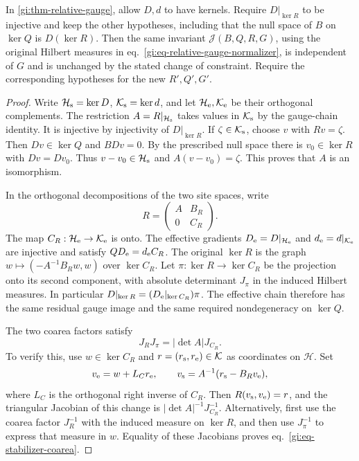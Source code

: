\documentclass[11pt,letterpaper,reqno]{amsart}
\makeatletter
\numberwithin{equation}{section}
\renewcommand{\eqref}[1]{\textup{eq.~\ref{#1}}}
\theoremstyle{definition}
\newcommand{\ms@majorstart}{%
  \pushQED{\qed}\renewcommand{\qedsymbol}{$\blacksquare\square$}}
\newenvironment{corollary}[1][]{\ms@majorstart\ms@corollary[#1]}
  {\popQED\endms@corollary}
\theoremstyle{remark}
\makeatother
\begin{document}
\begin{corollary}[A residual gauge with a stabilizer]
\label{gi:cor-relative-gauge-stabilizer}
In \cref{gi:thm-relative-gauge}, allow \(D,d\) to have kernels.
Require \(D|_{\ker R}\) to be injective and keep the other
hypotheses, including that the null space of \(B\) on \(\ker Q\)
is \(D(\ker R)\). Then the same invariant
\(\mathcal J(B,Q,R,G)\), using the original Hilbert measures in
\eqref{gi:eq-relative-gauge-normalizer}, is independent of \(G\)
and is unchanged by the stated change of constraint. Require
the corresponding hypotheses for the new \(R',Q',G'\).
\end{corollary}

\begin{proof}
Write \(\mathcal H_{\rm s}=\ker D\),
\(\mathcal K_{\rm s}=\ker d\), and let
\(\mathcal H_{\rm e},\mathcal K_{\rm e}\) be their orthogonal
complements. The restriction \(A=R|_{\mathcal H_{\rm s}}\)
takes values in \(\mathcal K_{\rm s}\) by the gauge-chain identity.
It is injective by injectivity of \(D|_{\ker R}\).
If \(\zeta\in\mathcal K_{\rm s}\), choose \(v\) with \(Rv=\zeta\).
Then \(Dv\in\ker Q\) and \(BDv=0\). By the prescribed null
space there is \(v_0\in\ker R\) with \(Dv=Dv_0\).
Thus \(v-v_0\in\mathcal H_{\rm s}\) and \(A(v-v_0)=\zeta\).
This proves that \(A\) is an isomorphism.

In the orthogonal decompositions of the two site spaces, write
\[
 R=\begin{pmatrix}A&B_R\\0&C_R\end{pmatrix}.
\]
The map \(C_R:\mathcal H_{\rm e}\to\mathcal K_{\rm e}\)
is onto. The effective gradients \(D_{\rm e}=D|_{\mathcal H_{\rm e}}\)
and \(d_{\rm e}=d|_{\mathcal K_{\rm e}}\) are injective and
satisfy \(QD_{\rm e}=d_{\rm e}C_R\). The original \(\ker R\)
is the graph \(w\mapsto(-A^{-1}B_Rw,w)\) over \(\ker C_R\).
Let \(\pi:\ker R\to\ker C_R\) be the projection onto its
second component, with absolute determinant \(J_\pi\) in
the induced Hilbert measures. In particular
\(D|_{\ker R}=(D_{\rm e}|_{\ker C_R})\pi\).
The effective chain therefore has the same residual gauge
image and the same required nondegeneracy on \(\ker Q\).

The two coarea factors satisfy
\begin{equation}\label{gi:eq-stabilizer-coarea}
                 J_R J_\pi=|\det A|J_{C_R}.
\end{equation}
To verify this, use \(w\in\ker C_R\) and
\(r=(r_{\rm s},r_{\rm e})\in\mathcal K\) as coordinates
on \(\mathcal H\). Set
\[
 v_{\rm e}=w+L_C r_{\rm e},\qquad
 v_{\rm s}=A^{-1}(r_{\rm s}-B_Rv_{\rm e}),
\]
where \(L_C\) is the orthogonal right inverse of \(C_R\).
Then \(R(v_{\rm s},v_{\rm e})=r\), and the triangular
Jacobian of this change is \(|\det A|^{-1}J_{C_R}^{-1}\).
Alternatively, first use the coarea factor \(J_R^{-1}\)
with the induced measure on \(\ker R\), and then use
\(J_\pi^{-1}\) to express that measure in \(w\).
Equality of these Jacobians proves \eqref{gi:eq-stabilizer-coarea}.


\end{proof}
\end{document}
